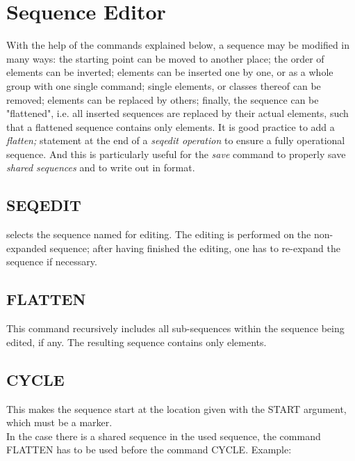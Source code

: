 
\chapter{Sequence Editor}
\label{chap:seqedit}
With the help of the commands explained below, a sequence may be
modified in many ways: the starting point can be moved to another place;
the order of elements can be inverted; elements can be inserted one by
one, or as a whole group with one single command; single elements, or
classes thereof can be removed; elements can be replaced by others;
finally, the sequence can be "flattened", i.e. all inserted sequences
are replaced by their actual elements, such that a flattened sequence
contains only elements. It is good practice to add a \textit{ flatten; }
statement at the end of a \textit{ seqedit operation } to ensure a fully
operational sequence. And this is particularly useful for the \textit{
  save } command to properly save \textit{ shared sequences } and to
write out in \madeight format.  


\section{SEQEDIT}
\label{sec:seqedit}
selects the sequence named for editing. The editing is performed on the
non-expanded sequence; after having finished the editing, one has to
re-expand the sequence if necessary.  

\section{FLATTEN}
\label{sec:flatten}
This command recursively includes all sub-sequences within the sequence
being edited, if any. The resulting sequence contains only elements.  

\section{CYCLE}
\label{sec:cycle}
This makes the sequence start at the location given with the START
argument, which must be a marker. \\ 
In the case there is a shared sequence in the used sequence, the
command FLATTEN has to be used before the command CYCLE. Example:  

